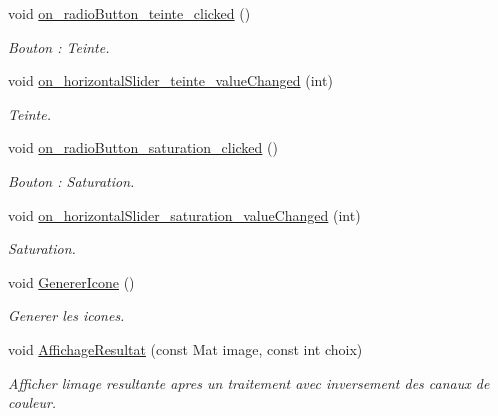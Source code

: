 \begin{DoxyCompactItemize}
void \hyperlink{classMainWindow_a313f05860248e6079a494d57308c17f7}{on\+\_\+radio\+Button\+\_\+teinte\+\_\+clicked} ()
\begin{DoxyCompactList}\small\item\em Bouton \+: Teinte. \end{DoxyCompactList}\item 
\mbox{\label{classMainWindow_a3015554666c7993c5f5e0fd774ea15ff}} 
void \hyperlink{classMainWindow_a3015554666c7993c5f5e0fd774ea15ff}{on\+\_\+horizontal\+Slider\+\_\+teinte\+\_\+value\+Changed} (int)
\begin{DoxyCompactList}\small\item\em Teinte. \end{DoxyCompactList}\item 
\mbox{\label{classMainWindow_a69d3be028b0f27bbccc93da966be4de8}} 
void \hyperlink{classMainWindow_a69d3be028b0f27bbccc93da966be4de8}{on\+\_\+radio\+Button\+\_\+saturation\+\_\+clicked} ()
\begin{DoxyCompactList}\small\item\em Bouton \+: Saturation. \end{DoxyCompactList}\item 
\mbox{\label{classMainWindow_a019b84323e618f825b2ed0ce03bfa048}} 
void \hyperlink{classMainWindow_a019b84323e618f825b2ed0ce03bfa048}{on\+\_\+horizontal\+Slider\+\_\+saturation\+\_\+value\+Changed} (int)
\begin{DoxyCompactList}\small\item\em Saturation. \end{DoxyCompactList}\item 
\mbox{\label{classMainWindow_ac7607afeed0426a455c2cb4832ce9e80}} 
void \hyperlink{classMainWindow_ac7607afeed0426a455c2cb4832ce9e80}{Generer\+Icone} ()
\begin{DoxyCompactList}\small\item\em Generer les icones. \end{DoxyCompactList}\item 
void \hyperlink{classMainWindow_a6a5fc1b965e50e296003a94a73fea202}{Affichage\+Resultat} (const Mat image, const int choix)
\begin{DoxyCompactList}\small\item\em Afficher l\textquotesingle{}image resultante apres un traitement avec inversement des canaux de couleur. \end{DoxyCompactList}\item 

\end{DoxyCompactItemize}
